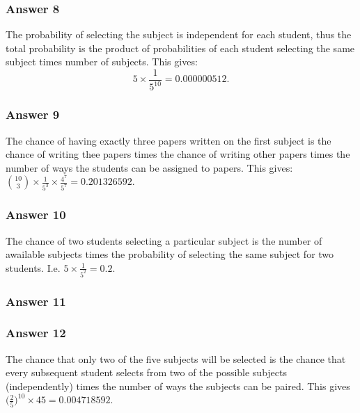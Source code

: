 \documentclass[11pt]{article}
\begin{document}
\subsubsection{Answer 8}
\label{sec-1-3-1}
The probability of selecting the subject is independent for each student,
thus the total probability is the product of probabilities of each student
selecting the same subject times number of subjects.  This gives:
\begin{equation*}
  5 \times \frac{1}{5^{10}} = \num{0.000000512}.
\end{equation*}
\subsubsection{Answer 9}
\label{sec-1-3-2}
The chance of having exactly three papers written on the first subject is
the chance of writing thee papers times the chance of writing other papers
times the number of ways the students can be assigned to papers.  This
gives:
$\binom{10}{3} \times \frac{1}{5^3} \times \frac{4^7}{5^7} = \num{0.201326592}$.
\subsubsection{Answer 10}
\label{sec-1-3-3}
The chance of two students selecting a particular subject is the number of
awailable subjects times the probability of selecting the same subject for
two students.  I.e. $5 \times \frac{1}{5^2} = 0.2$.
\subsubsection{Answer 11}
\label{sec-1-3-4}


\subsubsection{Answer 12}
\label{sec-1-3-5}
The chance that only two of the five subjects will be selected is the chance
that every subsequent student selects from two of the possible subjects
(independently) times the number of ways the subjects can be paired.  This
gives $\Big(\frac{2}{5}\Big)^10 \times 45 = \num{0.004718592}$.
\end{document}
